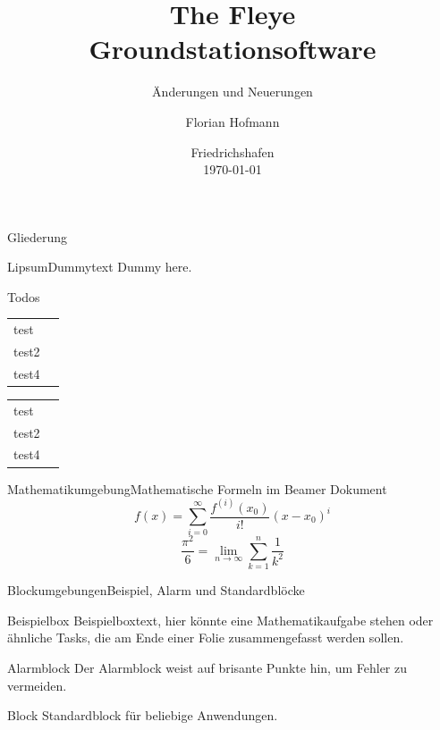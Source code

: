 \documentclass[
	12pt, 				%
	t,					%
	aspectratio=169,	%
	]{beamer}
\title{The Fleye \\Groundstationsoftware}
\subtitle{Änderungen und Neuerungen}
\author{%
		Florian Hofmann
		}
\date{Friedrichshafen\\\today}
\newcommand{\myCheck}{
	\begin{tikzpicture}[y=0.80pt, x=0.80pt, yscale=-0.2, xscale=0.2, inner sep=0pt, outer sep=0pt]
	\path[draw=myCol2,line join=round,line cap=round,miter limit=4.00,line
	width=2.100pt,rounded corners=0.0000cm] (295.0000,420.9336) rectangle
	(395.0000,520.9336);
	\path[draw=myCol1,line join=miter,line cap=round,miter limit=4.00,even odd
	rule,line width=2.5pt] (307.9327,463.8016) -- (341.2462,507.1091) --
	(410.6824,425.8807);
	\end{tikzpicture}}
\newcommand{\myUnCheck}{
	\begin{tikzpicture}[y=0.80pt, x=0.80pt, yscale=-0.2, xscale=0.2, inner sep=0pt, outer sep=0pt]
	\path[draw=myCol2,line join=round,line cap=round,miter limit=4.00,line
	width=2.100pt,rounded corners=0.0000cm] (295.0000,420.9336) rectangle
	(395.0000,520.9336);
	\end{tikzpicture}}
\begin{document}
		
	\begin{frame}[noframenumbering]
		\titlepage
	\end{frame}


	\begin{frame}{Gliederung}
		\tableofcontents
	\end{frame}




	\begin{frame}{Lipsum}{Dummytext}
		Dummy here.
	\end{frame}
	
	\begin{frame}{Todos}
		\begin{tabular}{p{8cm} l}
			test & \myCheck \\
			test2 & \myCheck \\
			test4 & \myUnCheck\\
		\end{tabular}
		
		\begin{tabularx}{0.99\textwidth}{Xl}
			test  & \myCheck   \\
			test2 & \myCheck   \\
			test4 & \myUnCheck \\
		\end{tabularx}
	\end{frame}
	
	
	
	
	\begin{frame}{Mathematikumgebung}{Mathematische Formeln im Beamer Dokument}
		\vfill
		\begin{equation*}
			f(x)=\sum_{i=0}^\infty \frac{f^{(i)}(x_0)}{i!}(x-x_0)^i
		\end{equation*}
		\vfill
		\begin{equation*}
			\displaystyle\frac{\pi^2}{6}=\lim_{n \to \infty}\sum_{k=1}^n \frac{1}{k^2}
		\end{equation*}
		\vfill
	\end{frame}
	
	
	\begin{frame}{Blockumgebungen}{Beispiel, Alarm und Standardblöcke}
	    \begin{exampleblock}{Beispielbox}
			Beispielboxtext, hier könnte eine Mathematikaufgabe 
			stehen oder ähnliche Tasks, die am Ende einer Folie zusammengefasst werden sollen.
		\end{exampleblock}
		\begin{alertblock}{Alarmblock}
			Der Alarmblock weist auf brisante Punkte hin, um Fehler zu vermeiden.
		\end{alertblock}
		\begin{block}{Block}
			Standardblock für beliebige Anwendungen.
		\end{block}
	\end{frame}
	
\end{document}
